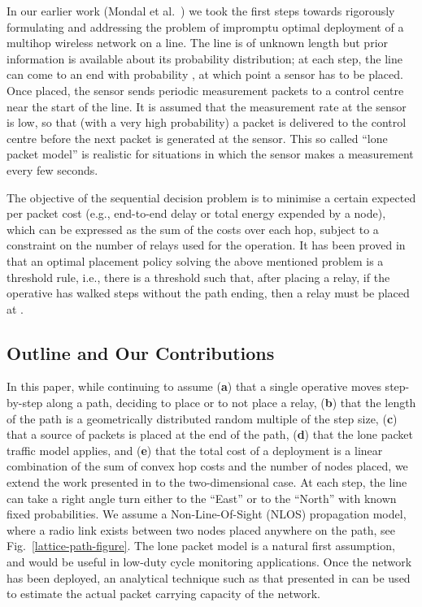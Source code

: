 \documentclass[conference]{IEEEtran}
\begin{document}
In our earlier work (Mondal et al.\
\cite{mondal-etal12impromptu-deployment_NCC}) we took the first steps
towards rigorously formulating and addressing the problem of impromptu
optimal deployment of a multihop wireless network on a line.  The line
is of unknown length but prior information is available about its
probability distribution; at each step, the line can come to an end
with probability , at which point a sensor has to be placed. Once
placed, the sensor sends periodic measurement packets to a control
centre near the start of the line.  It is assumed that the measurement
rate at the sensor is low, so that (with a very high probability) a
packet is delivered to the control centre before the next packet is
generated at the sensor. This so called ``lone packet model'' is
realistic for situations in which the sensor makes a measurement every
few seconds. 

The objective of the sequential decision problem is to minimise a
certain expected per packet cost (e.g., end-to-end delay or total
energy expended by a node), which can be expressed as the sum of the
costs over each hop, subject to a constraint on the number of relays
used for the operation. It has been proved in
\cite{mondal-etal12impromptu-deployment_NCC} that an optimal placement
policy solving the above mentioned problem is a threshold rule, i.e.,
there is a threshold  such that, after placing a relay, if the
operative has walked  steps without the path ending, then a relay
must be placed at .

\subsection{Outline and Our Contributions}
In this paper, while continuing to assume (\textbf{a}) that a single
operative moves step-by-step along a path, deciding to place or to not
place a relay, (\textbf{b}) that the length of the path is a
geometrically distributed random multiple of the step size,
(\textbf{c}) that a source of packets is placed at the end of the
path, (\textbf{d}) that the lone packet traffic model applies, and
(\textbf{e}) that the total cost of a deployment is a linear
combination of the sum of convex hop costs and the number of nodes
placed, we extend the work presented in
\cite{mondal-etal12impromptu-deployment_NCC} to the two-dimensional
case. At each step, the line can take a right angle turn either to the
``East'' or to the ``North'' with known fixed probabilities. We assume
a Non-Line-Of-Sight (NLOS) propagation model, where a radio link
exists between two nodes placed anywhere on the path, see
Fig.~\ref{lattice-path-figure}.  The lone packet model is a natural
first assumption, and would be useful in low-duty cycle monitoring
applications.  Once the network has been deployed, an analytical
technique such as that presented in
\cite{rachit-kumar12performance-analysis} can be used to estimate the
actual packet carrying capacity of the network.
\end{document}
